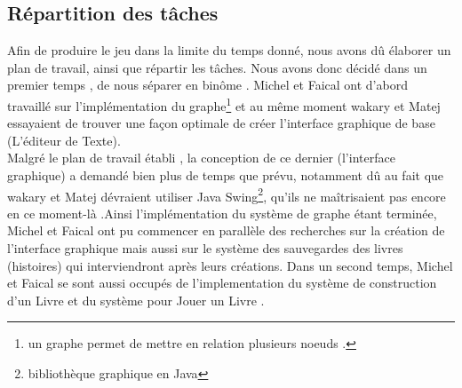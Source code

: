 \documentclass[12pt]{article}
\begin{document}
	    \subsection{Répartition des tâches}
	   Afin de produire le jeu dans la limite du temps donné, nous avons dû élaborer un plan de travail, ainsi que répartir les tâches. Nous avons donc décidé dans un premier temps , de nous séparer en binôme . Michel et Faical ont d'abord travaillé sur l'implémentation du graphe\footnote{un graphe permet de mettre en relation plusieurs noeuds .}  et au même moment wakary et Matej essayaient de trouver une façon optimale de créer l'interface graphique de base  (L'éditeur de Texte). \\Malgré le plan de travail établi , la conception de ce dernier (l'interface graphique) a demandé bien plus de temps que prévu, notamment dû au fait que wakary et Matej dévraient utiliser Java Swing\footnote{bibliothèque graphique en Java}, qu'ils ne maîtrisaient pas encore en ce moment-là .Ainsi l'implémentation du système de graphe étant terminée, Michel et Faical ont pu commencer en parallèle des recherches sur la création de l'interface graphique mais aussi sur le système des sauvegardes des livres (histoires) qui interviendront après leurs créations. Dans un second temps, Michel et Faical se sont aussi occupés de l'implementation du système de construction d'un Livre et du système pour Jouer un Livre . 
        \newpage
\end{document}
